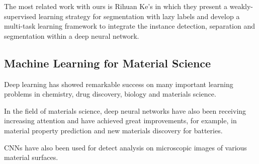 \documentclass[10pt,twocolumn,letterpaper]{article}
\begin{document}
The most related work with ours is Rihuan Ke's\cite{ke2019multi} in which they present a weakly-supervised learning strategy for segmentation with lazy labels and develop a multi-task learning framework to integrate the instance detection, separation and segmentation within a deep neural network.

\subsection{Machine Learning for Material Science}
Deep learning has showed remarkable success on many important 
learning problems in chemistry\cite{goh2017deep}, 
drug discovery\cite{gawehn2016deep}\cite{chen2018rise}, 
biology\cite{webb2018deep} and materials science.

In the field of materials science, deep neural networks have also been receiving increasing attention and have achieved great improvements, for example, in material property prediction and new materials discovery for batteries\cite{pilania2013accelerating}\cite{hansen2015machine}\cite{ward2016general}\cite{liu2017materials}.

CNNs have also been used for detect analysis on microscopic images of various material surfaces\cite{lubbers2017inferring}\cite{li2018automated}\cite{nash2018review}.
\end{document}
